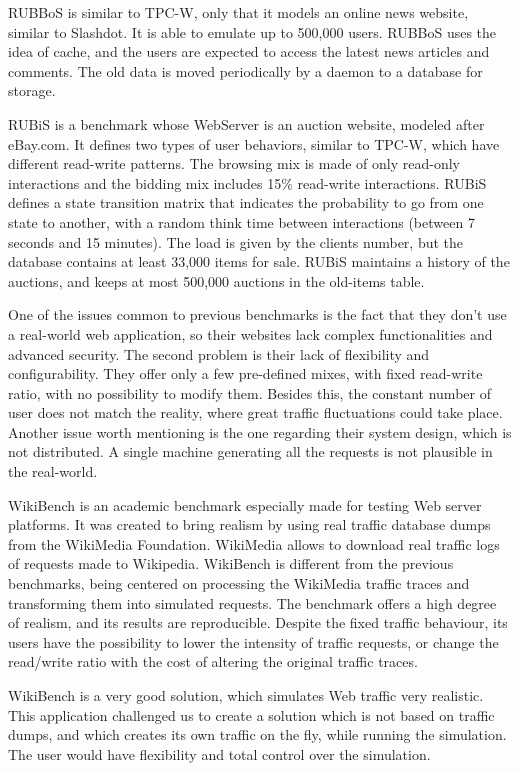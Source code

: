 RUBBoS is similar to TPC-W, only that it models an online news website, similar to Slashdot. It is able to emulate up to 500,000 users. RUBBoS uses the idea of cache, and the users are expected to access the latest news articles and comments. The old data is moved periodically by a daemon to a database for storage.

RUBiS is a benchmark whose WebServer is an auction website, modeled after eBay.com. It defines two types of user behaviors, similar to TPC-W, which have different read-write patterns. The browsing mix is made of only read-only interactions and the bidding mix includes 15\% read-write interactions. RUBiS defines a state transition matrix that indicates the probability to go from one state to another, with a random think time between interactions (between 7 seconds and 15 minutes). The load is given by the clients number, but the database contains at least 33,000 items for sale.  RUBiS maintains a history of the auctions, and keeps at most 500,000 auctions in the old-items table.

One of the issues common to previous benchmarks is the fact that they don't use a real-world web application, so their websites lack complex functionalities and advanced security. The second problem is their lack of flexibility and configurability. They offer only a few pre-defined mixes, with fixed read-write ratio, with no possibility to modify them. Besides this, the constant number of user does not match the reality, where great traffic fluctuations could take place. Another issue worth mentioning is the one regarding their system design, which is not distributed. A single machine generating all the requests is not plausible in the real-world.

WikiBench is an academic benchmark especially made for testing Web server platforms. It was created to bring realism by using real traffic database dumps from the WikiMedia Foundation. WikiMedia allows to download real traffic logs of requests made to Wikipedia.  WikiBench is different from the previous benchmarks, being centered on processing the WikiMedia traffic traces and transforming them into simulated requests. The benchmark offers a high degree of realism, and its results are reproducible. Despite the fixed traffic behaviour, its users have the possibility to lower the intensity of traffic requests, or change the read/write ratio with the cost of altering the original traffic traces.

WikiBench is a very good solution, which simulates Web traffic very realistic. This application challenged us to create a solution which is not based on traffic dumps, and which creates its own traffic on the fly, while running the simulation. The user would have flexibility and total control over the simulation.
